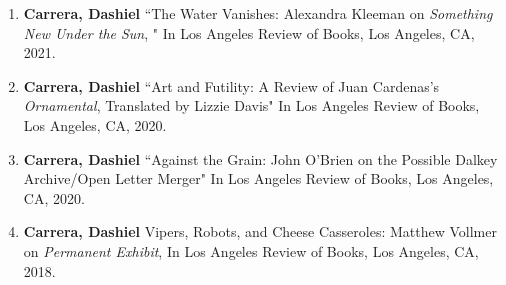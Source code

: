 \begin{enumerate}
\item \textbf{Carrera, Dashiel} ``The Water Vanishes: Alexandra Kleeman on \textit{Something New Under the Sun}, " In Los Angeles Review of Books, Los Angeles, CA, 2021.\\
\item \textbf{Carrera, Dashiel} ``Art and Futility: A Review of Juan Cardenas's \textit{Ornamental}, Translated by Lizzie Davis" In Los Angeles Review of Books, Los Angeles, CA, 2020.\\
\item \textbf{Carrera, Dashiel} ``Against the Grain: John O'Brien on the Possible Dalkey Archive/Open Letter Merger" In Los Angeles Review of Books, Los Angeles, CA, 2020. \\
\item \textbf{Carrera, Dashiel} Vipers, Robots, and Cheese Casseroles: Matthew Vollmer on \textit{Permanent Exhibit}, In Los Angeles Review of Books, Los Angeles, CA, 2018.\\
\end{enumerate}

%
%        

  





